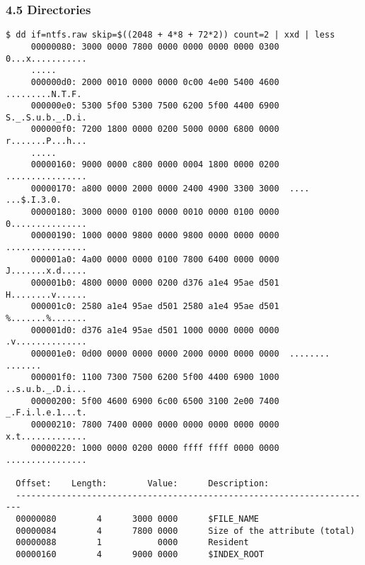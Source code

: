 \begin{frame}[fragile]
  \frametitle{4.5 Directories}
  \begin{lstlisting}[basicstyle=\tiny]
$ dd if=ntfs.raw skip=$((2048 + 4*8 + 72*2)) count=2 | xxd | less
     00000080: 3000 0000 7800 0000 0000 0000 0000 0300  0...x...........
     .....
     000000d0: 2000 0010 0000 0000 0c00 4e00 5400 4600   .........N.T.F.
     000000e0: 5300 5f00 5300 7500 6200 5f00 4400 6900  S._.S.u.b._.D.i.
     000000f0: 7200 1800 0000 0200 5000 0000 6800 0000  r.......P...h...
     .....
     00000160: 9000 0000 c800 0000 0004 1800 0000 0200  ................
     00000170: a800 0000 2000 0000 2400 4900 3300 3000  .... ...$.I.3.0.
     00000180: 3000 0000 0100 0000 0010 0000 0100 0000  0...............
     00000190: 1000 0000 9800 0000 9800 0000 0000 0000  ................
     000001a0: 4a00 0000 0000 0100 7800 6400 0000 0000  J.......x.d.....
     000001b0: 4800 0000 0000 0200 d376 a1e4 95ae d501  H........v......
     000001c0: 2580 a1e4 95ae d501 2580 a1e4 95ae d501  %.......%.......
     000001d0: d376 a1e4 95ae d501 1000 0000 0000 0000  .v..............
     000001e0: 0d00 0000 0000 0000 2000 0000 0000 0000  ........ .......
     000001f0: 1100 7300 7500 6200 5f00 4400 6900 1000  ..s.u.b._.D.i...
     00000200: 5f00 4600 6900 6c00 6500 3100 2e00 7400  _.F.i.l.e.1...t.
     00000210: 7800 7400 0000 0000 0000 0000 0000 0000  x.t.............
     00000220: 1000 0000 0200 0000 ffff ffff 0000 0000  ................

  Offset:    Length:        Value:      Description:
  -----------------------------------------------------------------------
  00000080        4      3000 0000      $FILE_NAME
  00000084        4      7800 0000      Size of the attribute (total)
  00000088        1           0000      Resident
  00000160        4      9000 0000      $INDEX_ROOT
  \end{lstlisting}
\end{frame}



